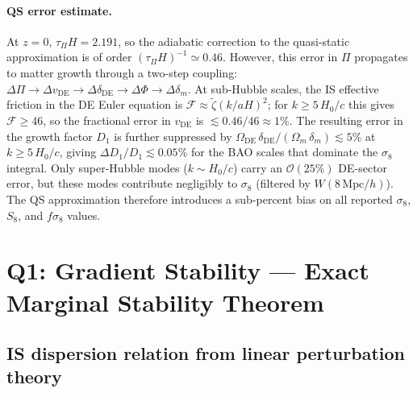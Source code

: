 \documentclass[12pt,a4paper]{article}
\newcommand{\tauPi}{\tau_\Pi}
\newcommand{\ztilde}{\tilde{\zeta}}
\begin{document}
\paragraph{QS error estimate.}
At $z=0$, $\tauPi H = 2.191$, so the adiabatic correction to the
quasi-static approximation is of order $(\tauPi H)^{-1} \simeq 0.46$.
However, this error in $\Pi$ propagates to matter growth through a
two-step coupling: $\Delta\Pi \to \Delta v_{\mathrm{DE}} \to
\Delta\delta_{\mathrm{DE}} \to \Delta\Phi \to \Delta\delta_m$.
At sub-Hubble scales, the IS effective friction in the DE Euler equation
is $\mathcal{F} \approx \ztilde(k/aH)^2$; for $k \geq 5\,H_0/c$ this
gives $\mathcal{F} \geq 46$, so the fractional error in $v_{\mathrm{DE}}$
is $\lesssim 0.46/46 \approx 1\%$.
The resulting error in the growth factor $D_1$ is further suppressed by
$\Omega_{\mathrm{DE}}\,\delta_{\mathrm{DE}}/(\Omega_m\,\delta_m) \lesssim
5\%$ at $k \geq 5\,H_0/c$, giving $\Delta D_1/D_1 \lesssim 0.05\%$ for
the BAO scales that dominate the $\sigma_8$ integral.
Only super-Hubble modes ($k \sim H_0/c$) carry an $\mathcal{O}(25\%)$
DE-sector error, but these modes contribute negligibly to $\sigma_8$
(filtered by $W(8\,\mathrm{Mpc}/h)$).
The QS approximation therefore introduces a sub-percent bias on all
reported $\sigma_8$, $S_8$, and $f\sigma_8$ values.

\section{Q1: Gradient Stability — Exact Marginal Stability Theorem}
\label{sec:Q1_stability}

\subsection{IS dispersion relation from linear perturbation theory}
\label{subsec:dispersion}
\end{document}
